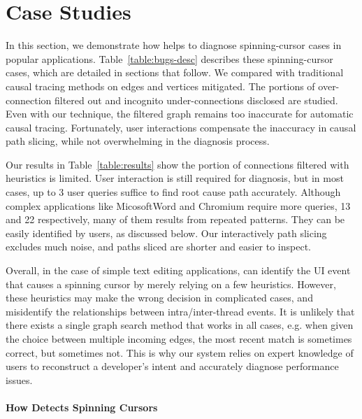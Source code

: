 \section{Case Studies}\label{sec:casestudy}

In this section, we demonstrate how \xxx helps to diagnose \nbug spinning-cursor
cases in popular applications. Table~\ref{table:bugs-desc} describes these
spinning-cursor cases, which are detailed in sections that follow. We compared
\xxx with traditional causal tracing methods on edges and vertices mitigated.
The portions of over-connection filtered out and incognito under-connections
disclosed are studied. Even with our technique, the filtered graph remains
too inaccurate for automatic causal tracing. Fortunately, user interactions
compensate the inaccuracy in causal path slicing, while not overwhelming in the
diagnosis process.

Our results in Table~\ref{table:results} show the portion of connections
filtered with heuristics is limited. User interaction is still required for
diagnosis, but in most cases, up to 3 user queries suffice to find root cause
path accurately. Although complex applications 
like MicosoftWord and Chromium
require more queries,
13 and 22 respectively, many of them results from repeated
patterns. They can be easily identified by users, as discussed below. Our
interactively path slicing excludes much noise, and paths sliced are shorter and easier to
inspect.

Overall, in the case of simple text editing applications, \xxx can identify the
UI event that causes a spinning cursor by merely relying on a few heuristics.
However, these heuristics may make the wrong decision in complicated cases, and
misidentify the relationships between intra/inter-thread events. It is unlikely
that there exists a single graph search method that works in all cases, e.g.
when given the choice between multiple incoming edges, the most recent match is
sometimes correct, but sometimes not. This is why our system relies on expert
knowledge of users to reconstruct a developer's intent and accurately diagnose
performance issues.

\paragraph{How \xxx Detects Spinning Cursors}

